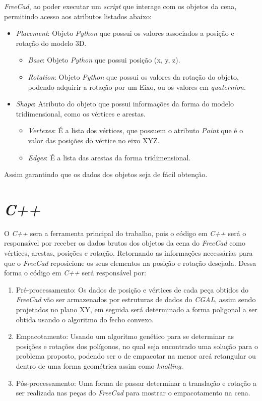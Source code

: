 \textit{FreeCad}, ao poder executar um \textit{script} que interage com os objetos da cena, permitindo acesso aos atributos listados abaixo:
\begin{itemize}
    \item \textit{Placement}: Objeto \textit{Python} que possui os valores associados a posição e rotação do modelo 3D.
    \begin{itemize}
        \item \textit{Base}: Objeto \textit{Python} que possui  posição (x, y, z).
        \item \textit{Rotation}: Objeto \textit{Python} que possui os valores da rotação do objeto, podendo adquirir a rotação por um Eixo, ou os valores em \textit{quaternion}.
    \end{itemize}
    \item \textit{Shape}: Atributo do objeto que possui informações da forma do modelo tridimensional, como os vértices e arestas.
    \begin{itemize}
        \item \textit{Vertexes}: É a lista dos vértices, que possuem o atributo \textit{Point} que é o valor das posições do vértice no eixo XYZ.
        \item \textit{Edges}: É a lista das arestas da forma tridimensional. 
    \end{itemize}
\end{itemize}

Assim garantindo que os dados dos objetos seja de fácil obtenção.

\section{\textit{C++}}
O \textit{C++} sera a ferramenta principal do trabalho, pois o código em \textit{C++} será o responsável por receber os dados brutos dos objetos da cena do \textit{FreeCad} como vértices, arestas, posições e rotação. Retornando as informações necessárias para que o \textit{FreeCad} reposicione os seus elementos na posição e rotação desejada. \newline
Dessa forma o código em \textit{C++} será responsável por:

\begin{enumerate}
    \item Pré-processamento: Os dados de posição e vértices de cada peça obtidos do \textit{FreeCad} vão ser armazenados por estruturas de dados do \textit{CGAL}\cite{cgal:complete_manual}, assim sendo projetados no plano XY, em seguida será determinado a forma poligonal a ser obtida usando o algoritmo do fecho convexo\cite{cgal:convex_hull}.
    \item Empacotamento: Usando um algoritmo genético para se determinar as posições e rotações dos polígonos, no qual seja encontrado uma solução para o problema proposto, podendo ser o de empacotar na menor areá retangular ou dentro de uma forma geométrica assim como \textit{knolling}.
    \item Pós-processamento: Uma forma de passar determinar a translação e rotação a ser realizada nas peças do \textit{FreeCad} para mostrar o empacotamento na cena.
\end{enumerate}

